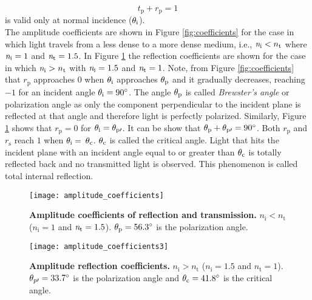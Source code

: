 \begin{equation}
t_\textrm{p}+r_\textrm{p} =  1
\end{equation}
is valid only at normal incidence ($\theta_{\textrm{i}}$).
\\ \indent The amplitude coefficients are shown in Figure \ref{fig:coefficients} for the case in which light travels from a less dense to a more dense medium, i.e., $\textit{n}_\textrm{i}<n_\textrm{t}$ where $\textit{n}_{\textrm{i}}= 1$ and $\textit{n}_{\textrm{t}}=1.5$. 
In Figure \ref{fig:coefficients2} the reflection coefficients are shown for the case in which $\textit{n}_\textrm{i}>n_\textrm{t}$ with $\textit{n}_{\textrm{i}}= 1.5$ and $\textit{n}_{\textrm{t}}=1$. Note, from Figure \ref{fig:coefficients} that $r_\textrm{p}$ approaches $0$ when $\theta_\textrm{i}$ approaches $\theta_\textrm{p}$ and it gradually decreases, reaching $-1$ for an incident angle $\theta_\textrm{i}=90^\circ$. The angle $\theta_\textrm{p}$ is called \textit{Brewster's angle} or polarization angle as only the component perpendicular to the incident plane is reflected at that angle and therefore light is perfectly polarized. Similarly, Figure \ref{fig:coefficients2} shows that $r_\textrm{p}=0$ for $\theta_\textrm{i}= \theta_{\textrm{p}\prime}$. It can be show that $\theta_\textrm{p}+ \theta_{\textrm{p}\prime}= 90^\circ$. Both $r_\textrm{p}$ and $r_\textrm{s}$ reach $1$ when $\theta_\textrm{i}= $ $\theta_\textrm{c}$. $\theta_\textrm{c}$ is called the critical angle. Light that hits the incident plane with an incident angle equal to or greater than $\theta_{\textrm{c}}$ is totally reflected back and no transmitted light is observed. This phenomenon is called total internal reflection. 
\begin{figure}[t]
  \begin{minipage}[h]{0.48\textwidth}
    \texttt{[image: amplitude\_coefficients]}
    \caption{\textbf{Amplitude coefficients of reflection and transmission.} $n_\textrm{i}<n_\textrm{t}$
($n_\textrm{i} = 1$ and $\textit{n}_\textrm{t}=1.5$). $\theta_\textrm{p} = 56.3^\circ$ is the polarization angle.}
    \label{fig:coefficients}
  \end{minipage}\hfill
  \begin{minipage}[h]{0.48\textwidth}
    \texttt{[image: amplitude\_coefficients3]}
    \caption{\textbf{Amplitude reflection coefficients.} $n_\textrm{i}>n_\textrm{t}$
($n_\textrm{i} = 1.5$ and $n_\textrm{t}=1$). $\theta_{p\prime}= 33.7^\circ$ is the polarization angle and $\theta_\textrm{c}= 41.8^\circ$ is the critical angle.}
   \label{fig:coefficients2}
 \end{minipage}
\end{figure}\\
